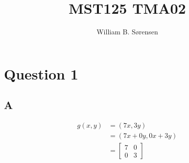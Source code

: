 \documentclass{article}
\author{William B. Sørensen}
\title{MST125 TMA02}
\begin{document}
\maketitle
\tableofcontents

\section{Question 1}

\subsection{A}

\begin{align}
    g(x, y) &= (7x, 3y) \\
            &= (7x + 0y, 0x + 3y) \\
            &= \begin{bmatrix}
                7 & 0 \\
                0 & 3
            \end{bmatrix}
\end{align}
\end{document}
